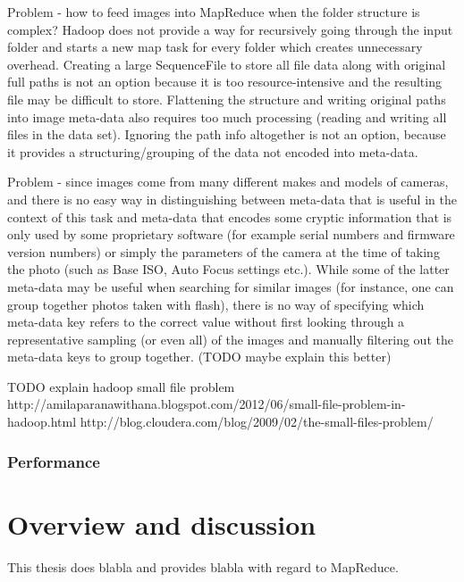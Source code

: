 \documentclass [12pt,a4paper]{report}
\begin{document}
Problem - how to feed images into MapReduce when the folder structure is complex? Hadoop does not provide a way for recursively going through the input folder and starts a new map task for every folder which creates unnecessary overhead. Creating a large SequenceFile to store all file data along with original full paths is not an option because it is too resource-intensive and the resulting file may be difficult to store. Flattening the structure and writing original paths into image meta-data also requires too much processing (reading and writing all files in the data set). Ignoring the path info altogether is not an option, because it provides a structuring/grouping of the data not encoded into meta-data.

Problem - since images come from many different makes and models of cameras, and there is no easy way in distinguishing between meta-data that is useful in the context of this task and meta-data that encodes some cryptic information that is only used by some proprietary software (for example serial numbers and firmware version numbers) or simply the parameters of the camera at the time of taking the photo (such as Base ISO, Auto Focus settings etc.). While some of the latter meta-data may be useful when searching for similar images (for instance, one can group together photos taken with flash), there is no way of specifying which meta-data key refers to the correct value without first looking through a representative sampling (or even all) of the images and manually filtering out the meta-data keys to group together. (TODO maybe explain this better)

TODO explain hadoop small file problem
http://amilaparanawithana.blogspot.com/2012/06/small-file-problem-in-hadoop.html
http://blog.cloudera.com/blog/2009/02/the-small-files-problem/

\subsection{Performance}

\chapter{Overview and discussion}

This thesis does blabla and provides blabla with regard to MapReduce. 

\clearpage
{}


\end{document}
